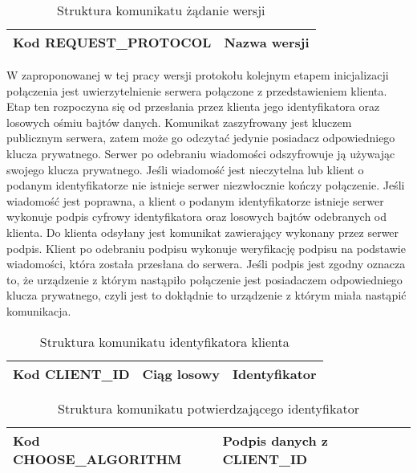 \begin{table}[H]
\centering
\caption{Struktura komunikatu żądanie wersji}

\begin{tabular}{|p{5cm}|p{6cm}|}
\hline
\raggedright{Kod REQUEST\_PROTOCOL} & Nazwa wersji\\
\hline
\end{tabular}
\end{table}

W zaproponowanej w tej pracy wersji protokołu kolejnym etapem
inicjalizacji połączenia jest uwierzytelnienie serwera połączone z
przedstawieniem klienta. Etap ten rozpoczyna się od przesłania przez
klienta jego identyfikatora oraz losowych ośmiu bajtów
danych. Komunikat zaszyfrowany jest kluczem publicznym serwera, zatem
może go odczytać jedynie posiadacz odpowiedniego klucza
prywatnego. Serwer po odebraniu wiadomości odszyfrowuje ją używając
swojego klucza prywatnego. Jeśli wiadomość jest nieczytelna lub klient
o podanym identyfikatorze nie istnieje serwer niezwłocznie kończy
połączenie. Jeśli wiadomość jest poprawna, a klient o podanym
identyfikatorze istnieje serwer wykonuje podpis cyfrowy identyfikatora
oraz losowych bajtów odebranych od klienta. Do klienta odsyłany jest
komunikat zawierający wykonany przez serwer podpis. Klient po
odebraniu podpisu wykonuje weryfikację podpisu na podstawie
wiadomości, która została przesłana do serwera. Jeśli podpis jest
zgodny oznacza to, że urządzenie z którym nastąpiło połączenie jest
posiadaczem odpowiedniego klucza prywatnego, czyli jest to dokłądnie
to urządzenie z którym miała nastąpić komunikacja.

\begin{table}[H]
\centering
\caption{Struktura komunikatu identyfikatora klienta }

\begin{tabular}{|p{3cm}|p{3cm}|p{6cm}|}
\hline
Kod CLIENT\_ID & Ciąg losowy & Identyfikator\\
\hline
\end{tabular}
\end{table}

\begin{table}[H]
\centering
\caption{Struktura komunikatu potwierdzającego identyfikator }

\begin{tabular}{|p{6cm}|p{6cm}|}
\hline
Kod CHOOSE\_ALGORITHM & Podpis danych z CLIENT\_ID\\
\hline
\end{tabular}
\end{table}

